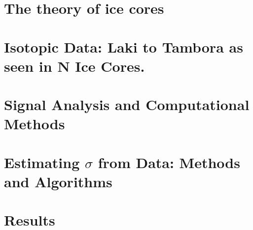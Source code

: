 \documentclass[11pt]{memoir} %
\begin{document}



\chapter[Ice Theory][Ice Theory]{The theory of ice cores}




\chapter[Data][Data]{Isotopic Data: Laki to Tambora as seen in N Ice Cores.}





\chapter[Signal Analysis \& Comp. Meth.][Signal Analysis \& Comp. Meth.]{Signal Analysis and Computational Methods}





%


\chapter[Method][Method]{Estimating $\sigma$ from Data: Methods and Algorithms}




\chapter[Results]{Results}




%
\end{document}
